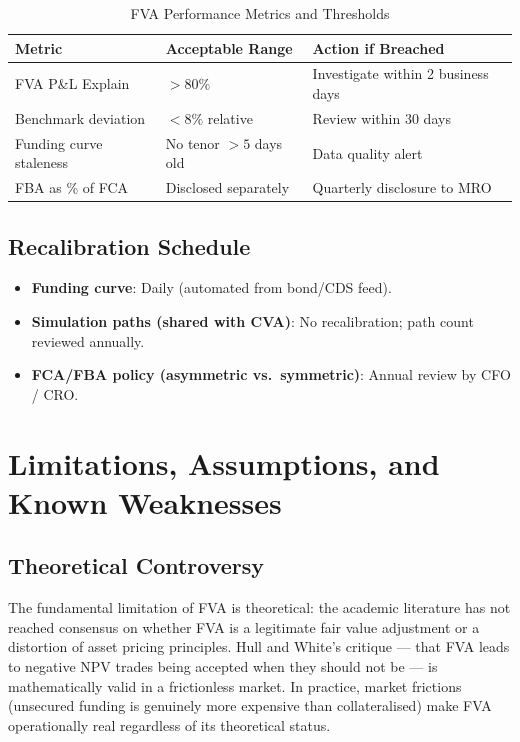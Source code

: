 \documentclass[11pt,a4paper]{article}
\begin{document}
\begin{table}[h!]
\centering
\caption{FVA Performance Metrics and Thresholds}
\begin{tabular}{@{}lll@{}}
\toprule
\textbf{Metric} & \textbf{Acceptable Range} & \textbf{Action if Breached} \\
\midrule
FVA P\&L Explain          & $>80\%$                & Investigate within 2 business days \\
Benchmark deviation       & $<8\%$ relative        & Review within 30 days \\
Funding curve staleness   & No tenor $>5$ days old & Data quality alert \\
FBA as \% of FCA          & Disclosed separately   & Quarterly disclosure to MRO \\
\bottomrule
\end{tabular}
\end{table}

\subsection{Recalibration Schedule}

\begin{itemize}[leftmargin=*]
  \item \textbf{Funding curve}: Daily (automated from bond/CDS feed).
  \item \textbf{Simulation paths (shared with CVA)}: No recalibration; path count reviewed annually.
  \item \textbf{FCA/FBA policy (asymmetric vs.\ symmetric)}: Annual review by CFO / CRO.
\end{itemize}

\section{Limitations, Assumptions, and Known Weaknesses}

\subsection{Theoretical Controversy}

The fundamental limitation of FVA is theoretical: the academic literature has not reached
consensus on whether FVA is a legitimate fair value adjustment or a distortion of asset pricing
principles. Hull and White's critique --- that FVA leads to negative NPV trades being accepted
when they should not be --- is mathematically valid in a frictionless market. In practice,
market frictions (unsecured funding is genuinely more expensive than collateralised) make FVA
operationally real regardless of its theoretical status.
\end{document}
